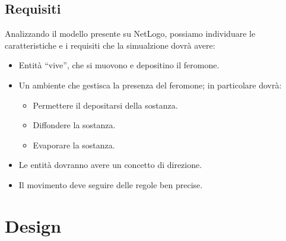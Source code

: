 \documentclass[12pt,a4paper,openright,twoside]{book}
\begin{document}
\section{Requisiti} %
Analizzando il modello presente su NetLogo\cite{wilensky1997netlogo}, possiamo individuare 
le caratteristiche e i requisiti che la simualzione dovrà avere:
\begin{itemize}
    \item Entità ``vive'', che si muovono e depositino il feromone.
    \item Un ambiente che gestisca la presenza del feromone; in particolare dovrà:
    \begin{itemize}
        \item Permettere il depositarsi della sostanza.
        \item Diffondere la sostanza.
        \item Evaporare la sostanza.
    \end{itemize}
    \item Le entità dovranno avere un concetto di direzione.
    \item Il movimento deve seguire delle regole ben precise.
\end{itemize}

\chapter{Design}
\end{document}
